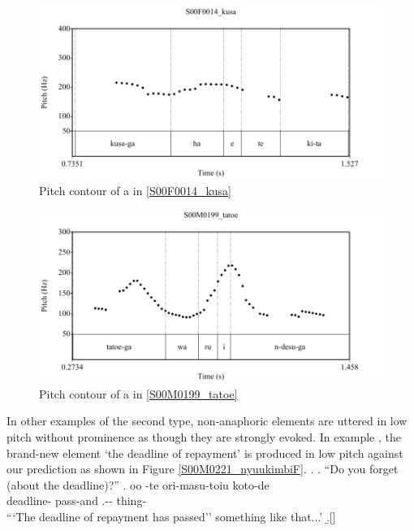 \begin{figure}
	\begin{center}
	\includegraphics[width=.5\textwidth]{sounds/S00F0014_kusa.pdf}
	\caption{Pitch contour of a in \ref{S00F0014_kusa}}
	\label{S00F0014_kusaF}
	\end{center}
\end{figure}
\begin{figure}
	\begin{center}
	\includegraphics[width=.5\textwidth]{sounds/S00M0199_tatoe.pdf}
	\caption{Pitch contour of a in \ref{S00M0199_tatoe}}
	\label{S00M0199_tatoeF}
	\end{center}
\end{figure}
%
In other examples of the second type,
non-anaphoric elements are uttered in low pitch without prominence
as though they are strongly evoked.
In example \Next,
the brand-new element  `the deadline of repayment' is produced in low pitch against our prediction
as shown in Figure \ref{S00M0221_nyuukimbiF}.
%
\ex.\label{S00M0221_nyuukimbi}
 \a. ``Do you forget (about the deadline)?''
 \bg. oo \tp{\dvline}  \tp{\dvline} -te ori-masu-toiu koto-de \tp{\dvline} \\
       {} deadline- {} pass-and .-- thing- \\
      ```The deadline of repayment has passed'' something like that...'
  \b.[] 


